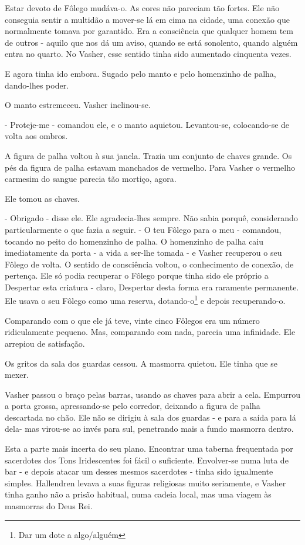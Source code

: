 \documentclass[11pt,a4paper]{book}
\begin{document}
 Estar devoto de Fôlego mudáva-o.  As cores não pareciam tão fortes. Ele não conseguia sentir a multidão a mover-se lá em cima na cidade, uma conexão que normalmente tomava por garantido. Era a consciência que qualquer homem tem de outros - aquilo que nos dá um aviso, quando se está sonolento, quando alguém entra no quarto. No Vasher, esse sentido tinha sido aumentado cinquenta vezes. 
 
 E agora tinha ido embora. Sugado pelo manto e pelo homenzinho de palha, dando-lhes poder.
 
 O manto estremeceu. Vasher inclinou-se.
 
 - Proteje-me - comandou ele, e o manto aquietou. Levantou-se, colocando-se de volta aos ombros.
 
 A figura de palha voltou à sua janela. Trazia um conjunto de chaves grande. Os pés da figura de palha estavam manchados de vermelho. Para Vasher o vermelho carmesim do sangue parecia tão mortiço, agora.
 
 Ele tomou as chaves.
 
 - Obrigado - disse ele. Ele agradecia-lhes sempre. Não sabia porquê, considerando particularmente o que fazia a seguir. - O teu Fôlego para o meu - comandou, tocando no peito do homenzinho de palha. O homenzinho de palha caiu imediatamente da porta - a vida a ser-lhe tomada - e Vasher recuperou o seu Fôlego de volta. O sentido de consciência voltou, o conhecimento de conexão, de pertença. Ele só podia recuperar o Fôlego porque tinha sido ele próprio a Despertar esta criatura - claro, Despertar desta forma era raramente permanente. Ele usava o seu Fôlego como uma reserva, dotando-o\footnote{Dar um dote a algo/alguém} e depois recuperando-o.

 Comparando com o que ele já teve, vinte cinco Fôlegos era um número ridiculamente pequeno. Mas, comparando com nada, parecia uma infinidade. Ele arrepiou de satisfação.
 
 Os gritos da sala dos guardas cessou. A masmorra quietou. Ele tinha que se mexer.
 
 Vasher passou o braço pelas barras, usando as chaves para abrir a cela. Empurrou a porta grossa, apressando-se pelo corredor, deixando a figura de palha descartada no chão. Ele não se dirigiu à sala dos guardas - e para a saída para lá dela- mas virou-se ao invés para sul, penetrando mais a fundo masmorra dentro.

 Esta a parte mais incerta do seu plano. Encontrar uma taberna frequentada por sacerdotes dos Tons Iridescentes foi fácil o suficiente. Envolver-se numa luta de bar - e depois atacar um desses mesmos sacerdotes - tinha sido igualmente simples. Hallendren levava a suas figuras religiosas muito seriamente, e Vasher tinha ganho não a prisão habitual, numa cadeia local, mas uma viagem às masmorras do Deus Rei.
\end{document}
